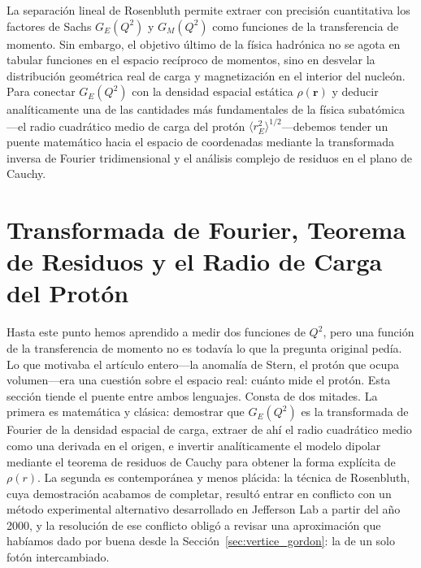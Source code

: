 \documentclass[10pt,a4paper]{article}
\begin{document}
La separación lineal de Rosenbluth permite extraer con precisión cuantitativa los factores de Sachs $G_E(Q^2)$ y $G_M(Q^2)$ como funciones de la transferencia de momento. Sin embargo, el objetivo último de la física hadrónica no se agota en tabular funciones en el espacio recíproco de momentos, sino en desvelar la distribución geométrica real de carga y magnetización en el interior del nucleón. Para conectar $G_E(Q^2)$ con la densidad espacial estática $\rho(\mathbf{r})$ y deducir analíticamente una de las cantidades más fundamentales de la física subatómica---el radio cuadrático medio de carga del protón $\langle r_E^2 \rangle^{1/2}$---debemos tender un puente matemático hacia el espacio de coordenadas mediante la transformada inversa de Fourier tridimensional y el análisis complejo de residuos en el plano de Cauchy.
\section{Transformada de Fourier, Teorema de Residuos y el Radio de Carga del Protón}
\label{sec:radio_fourier}

Hasta este punto hemos aprendido a medir dos funciones de $Q^2$, pero una función de la transferencia de momento no es todavía lo que la pregunta original pedía. Lo que motivaba el artículo entero---la anomalía de Stern, el protón que ocupa volumen---era una cuestión sobre el espacio real: cuánto mide el protón. Esta sección tiende el puente entre ambos lenguajes. Consta de dos mitades. La primera es matemática y clásica: demostrar que $G_E(Q^2)$ es la transformada de Fourier de la densidad espacial de carga, extraer de ahí el radio cuadrático medio como una derivada en el origen, e invertir analíticamente el modelo dipolar mediante el teorema de residuos de Cauchy para obtener la forma explícita de $\rho(r)$. La segunda es contemporánea y menos plácida: la técnica de Rosenbluth, cuya demostración acabamos de completar, resultó entrar en conflicto con un método experimental alternativo desarrollado en Jefferson Lab a partir del año 2000, y la resolución de ese conflicto obligó a revisar una aproximación que habíamos dado por buena desde la Sección~\ref{sec:vertice_gordon}: la de un solo fotón intercambiado.
\end{document}
